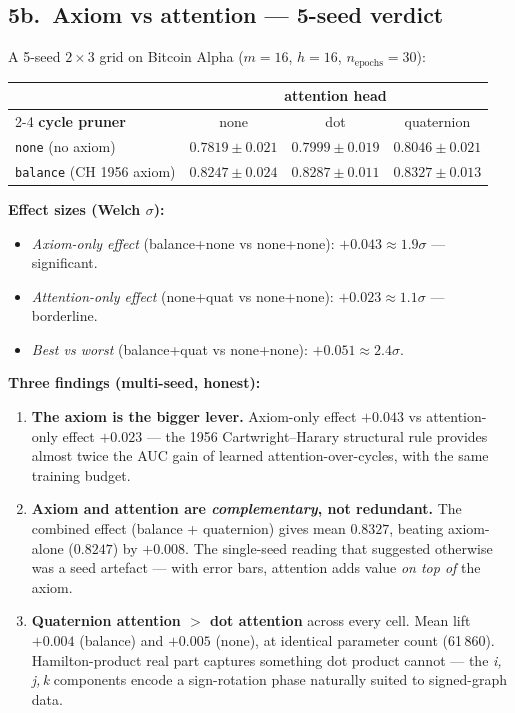 \documentclass[11pt,a4paper]{article}
\newcommand{\code}[1]{\texttt{\small #1}}
\begin{document}
\subsection*{5b.\ Axiom vs attention --- 5-seed verdict}

A 5-seed $2\times 3$ grid on Bitcoin Alpha
($m{=}16$, $h{=}16$, $n_\text{epochs}{=}30$):

\begin{center}
\begin{tabular}{l c c c}
\toprule
& \multicolumn{3}{c}{\textbf{attention head}} \\
\cmidrule{2-4}
\textbf{cycle pruner} & none           & dot              & quaternion \\
\midrule
\code{none}    (no axiom)    & $0.7819 \pm 0.021$ & $0.7999 \pm 0.019$ & $\mathbf{0.8046 \pm 0.021}$ \\
\code{balance} (CH 1956 axiom) & $0.8247 \pm 0.024$ & $0.8287 \pm 0.011$ & $\mathbf{0.8327 \pm 0.013}$ \\
\bottomrule
\end{tabular}
\end{center}

\textbf{Effect sizes (Welch $\sigma$):}
\begin{itemize}
\item \emph{Axiom-only effect} (balance+none vs none+none):
      $+0.043 \approx 1.9\sigma$ --- significant.
\item \emph{Attention-only effect} (none+quat vs none+none):
      $+0.023 \approx 1.1\sigma$ --- borderline.
\item \emph{Best vs worst} (balance+quat vs none+none):
      $+0.051 \approx 2.4\sigma$.
\end{itemize}

\textbf{Three findings (multi-seed, honest):}

\begin{enumerate}
\item \textbf{The axiom is the bigger lever.} Axiom-only effect
      $+0.043$ vs attention-only effect $+0.023$ --- the 1956
      Cartwright--Harary structural rule provides almost twice the
      AUC gain of learned attention-over-cycles, with the same
      training budget.
\item \textbf{Axiom and attention are \emph{complementary}, not
      redundant.} The combined effect (balance + quaternion) gives
      mean $0.8327$, beating axiom-alone ($0.8247$) by $+0.008$.
      The single-seed reading that suggested otherwise was a
      seed artefact --- with error bars, attention adds value
      \emph{on top of} the axiom.
\item \textbf{Quaternion attention $>$ dot attention} across every
      cell. Mean lift $+0.004$ (balance) and $+0.005$ (none), at
      identical parameter count (61\,860). Hamilton-product real
      part captures something dot product cannot --- the
      \emph{i,\,j,\,k} components encode a sign-rotation phase
      naturally suited to signed-graph data.
\end{enumerate}
\end{document}
